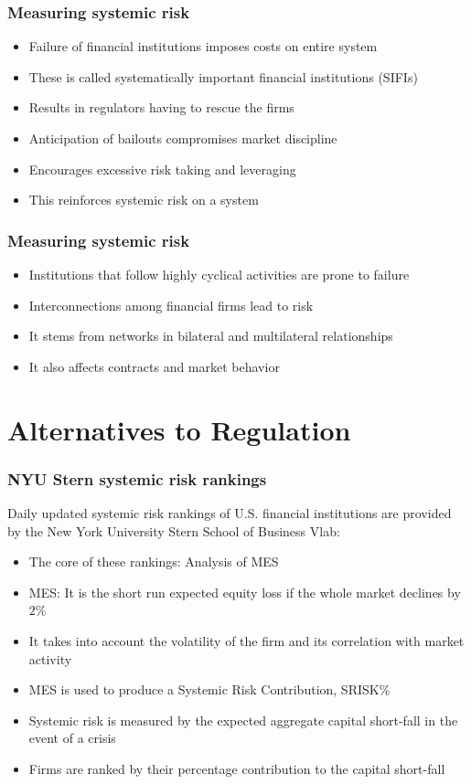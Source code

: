 \documentclass[11pt]{beamer}
\begin{document}
\begin{frame}
\frametitle{Measuring systemic risk}
\begin{itemize}\itemsep10pt
\item Failure of financial institutions imposes costs on entire system
\item These is called systematically important financial institutions (SIFIs)
\item Results in regulators having to rescue the firms
\item Anticipation of bailouts compromises market discipline
\item Encourages excessive risk taking and leveraging
\item This reinforces systemic risk on a system
\end{itemize}
\end{frame}


\begin{frame}
\frametitle{Measuring systemic risk}
\begin{itemize}\itemsep10pt
\item Institutions that follow highly cyclical activities are prone to failure
\item Interconnections among financial firms lead to risk
\item It stems from networks in bilateral and multilateral relationships
\item It also affects contracts and market behavior
\end{itemize}
\end{frame}

%
\section{Alternatives to Regulation}
%

\begin{frame}
\frametitle{NYU Stern systemic risk rankings}
Daily updated systemic risk rankings of U.S. financial institutions are provided by the New York University Stern School of Business Vlab:
\begin{itemize}
\item The core of these rankings: Analysis of MES
\item MES: It is the short run expected equity loss if the whole market declines by $2\%$
\item It takes into account the volatility of the firm and its correlation with market activity
\item MES is used to produce a Systemic Risk Contribution, SRISK\%
\item Systemic risk is measured by the expected aggregate capital short-fall in the event of a crisis
\item Firms are ranked by their percentage contribution to the capital short-fall
\end{itemize}
\end{frame}
\end{document}
